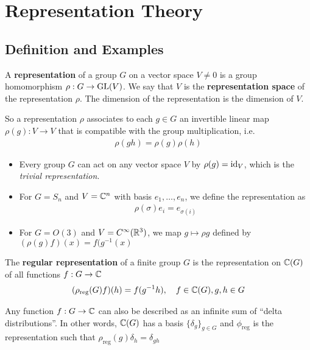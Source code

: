 
\section{Representation Theory}
\subsection{Definition and Examples}

\begin{dfn}[]
  A \textbf{representation} of a group $G$ on a vector space $V \neq 0$ is a group homomorphism $\rho: G \to \operatorname{GL}(V)$.
  We say that $V$ is the \textbf{representation space} of the representation $\rho$.
  The dimension of the representation is the dimension of $V$.
\end{dfn}
So a representation $\rho$ associates to each $g \in G$ an invertible linear map $\rho(g): V \to  V$ that is compatible with the group multiplication, i.e.
\begin{align*}
  \rho(gh) = \rho(g) \rho(h)
\end{align*}


\begin{ex}[]
  \begin{itemize}
    \item Every group $G$ can act on any vector space $V$ by $\rho(g) = \operatorname{id}_V$, which is the \emph{trivial representation}.
    \item For $G = S_n$ and $V = \mathbb{C}^{n}$ with basis $e_{1}, \ldots, e_{n}$, we define the representation as
      \begin{align*}
        \rho(\sigma)e_i = e_{\sigma(i)}
      \end{align*}
    \item For $G = O(3)$ and $V = C^{\infty}(\mathbb{R}^{3})$, we map $g \mapsto  \rho g$ defined by $(\rho(g)f)(x) = f(g^{-1}(x)$
  \end{itemize}
\end{ex}

\begin{dfn}[]
  The \textbf{regular representation} of a finite group $G$ is the representation on $\mathbb{C}(G)$ of all functions $f: G \to  \mathbb{C}$
  \begin{align*}
    (\rho_{\text{reg}}(G)f)(h) = f(g^{-1}h), \quad f \in \mathbb{C}(G), g,h \in G
  \end{align*}
\end{dfn}
Any function $f: G \to \mathbb{C}$ can also be described as an infinite sum of ``delta distributions''.
In other words, $\mathbb{C}(G)$ has a basis $\{\delta_g\}_{g \in G}$ and $\phi_{\text{reg}}$ is the representation such that $\rho_{\text{reg}}(g)\delta_h = \delta_{gh}$


